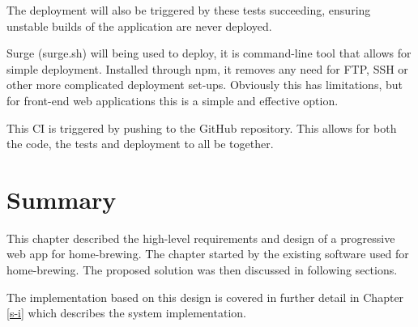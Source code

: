 The deployment will also be triggered by these tests succeeding, ensuring unstable builds of the application are never deployed.

Surge (surge.sh) will being used to deploy, it is command-line tool that allows for simple deployment. Installed through npm, it removes any need for FTP, SSH or other more complicated deployment set-ups. Obviously this has limitations, but for front-end web applications this is a simple and effective option. \cite{surge}

This CI is triggered by pushing to the GitHub repository. This allows for both the code, the tests and deployment to all be together.

\section{Summary} \label{a-d--summary}

This chapter described the high-level requirements and design of a progressive web app for home-brewing. The chapter started by the existing software used for home-brewing. The proposed solution was then discussed in following sections.

The implementation based on this design is covered in further detail in Chapter \ref{s-i} which describes the system implementation.
